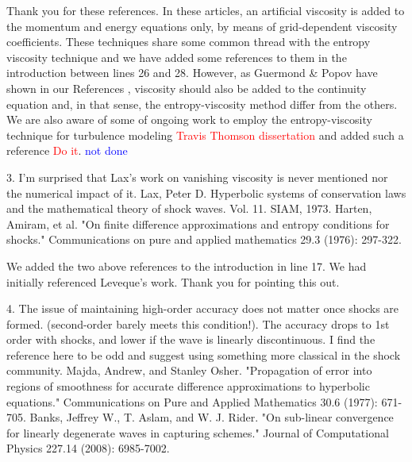 \documentclass{article}
\newcommand{\tcr}[1]{\textcolor{red}{#1}}
\newcommand{\tcb}[1]{\textcolor{blue}{#1}}
\begin{document}
Thank you for these references. In these articles, an artificial viscosity is added to the momentum
and energy equations only, by means of grid-dependent viscosity coefficients. These techniques share some common thread with
the entropy viscosity technique and we have added some references to them in the introduction between lines 26 and 28.
However, as Guermond \& Popov have shown in our References \cite{jlg1, jlg2}, viscosity should also be added to the continuity equation and, in that sense, the entropy-viscosity method differ from the others.\\
We are also aware of some of ongoing work to employ the entropy-viscosity technique for turbulence modeling \tcr{Travis Thomson dissertation} and added such a reference \tcr{Do it}. \tcb{not done}
\bigskip


{
\color{blue}
3. I'm surprised that Lax's work on vanishing viscosity is never mentioned
nor the numerical impact of it.
Lax, Peter D. Hyperbolic systems of conservation laws and the
mathematical theory of shock waves. Vol. 11. SIAM, 1973.
Harten, Amiram, et al. "On finite difference approximations and entropy
conditions for shocks." Communications on pure and applied mathematics
29.3 (1976): 297-322. 
}

We added the two above references to the introduction in line 17. We had initially referenced Leveque's work. Thank you for pointing this out.
\bigskip


{
\color{blue}
4. The issue of maintaining high-order accuracy does not matter once
shocks are formed. (second-order barely meets this condition!). The
accuracy drops to 1st order with shocks, and lower if the wave is linearly
discontinuous. I find the reference here to be odd and suggest using
something more classical in the shock community.
Majda, Andrew, and Stanley Osher. "Propagation of error into regions of
smoothness for accurate difference approximations to hyperbolic
equations." Communications on Pure and Applied Mathematics 30.6
(1977): 671-705.
Banks, Jeffrey W., T. Aslam, and W. J. Rider. "On sub-linear convergence
for linearly degenerate waves in capturing schemes." Journal of
Computational Physics 227.14 (2008): 6985-7002.
}
\end{document}
